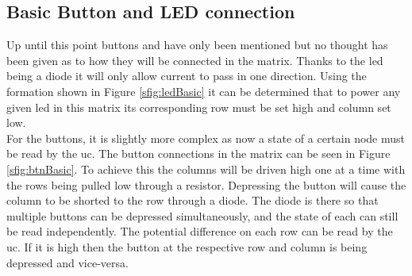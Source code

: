 \documentclass[12pt,a4paper]{report}
\begin{document}
\subsection{Basic Button and LED connection}
Up until this point buttons and  have only been mentioned but no thought has been given as to how they will be connected in the matrix. Thanks to the \ac{led} being a diode it will only allow current to pass in one direction. Using the formation shown in Figure \ref{sfig:ledBasic} it can be determined that to power any given \ac{led} in this matrix its corresponding row must be set high and column set low.\\
For the buttons, it is slightly more complex as now a state of a certain node must be read by the \ac{uc}. The button connections in the matrix can be seen in Figure \ref{sfig:btnBasic}. To achieve this the columns will be driven high one at a time with the rows being pulled low through a resistor. Depressing the button will cause the column to be shorted to the row through a diode. The diode is there so that multiple buttons can be depressed simultaneously, and the state of each can still be read independently. The potential difference on each row can be read by the \ac{uc}. If it is high then the button at the respective row and column is being depressed and vice-versa.
\end{document}
